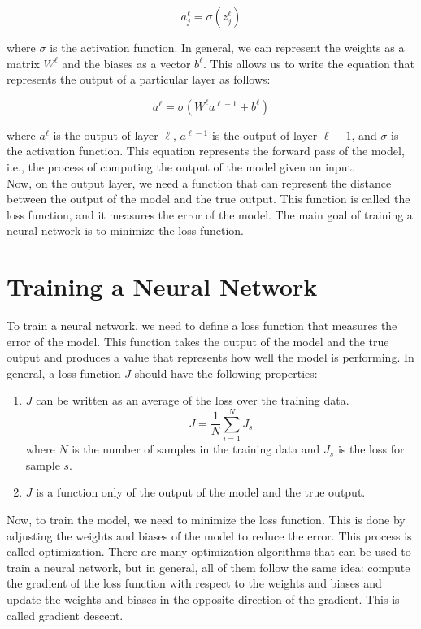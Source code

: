 \begin{equation}
    a_j^\ell = \sigma(z_j^\ell)
\end{equation}

where $\sigma$ is the activation function. In general, we can represent the weights
as a matrix $W^\ell$ and the biases as a vector $b^\ell$. This allows us to write
the equation that represents the output of a particular layer as follows:

\begin{equation}
    a^\ell = \sigma(W^\ell a^{\ell-1} + b^\ell)
\end{equation}
    
where $a^\ell$ is the output of layer $\ell$, $a^{\ell-1}$ is the output of layer
$\ell-1$, and $\sigma$ is the activation function. This equation represents the
forward pass of the model, i.e., the process of computing the output of the model
given an input.\\

Now, on the output layer, we need a function that can represent the distance between
the output of the model and the true output. This function is called the loss function,
and it measures the error of the model. The main goal of training a neural network is
to minimize the loss function.

\section{Training a Neural Network}

To train a neural network, we need to define a loss function that measures the error
of the model. This function takes the
output of the model and the true output and produces a value that represents how
well the model is performing. In general, a loss function $J$ should have the 
following properties:

\begin{enumerate}
    \item $J$ can be written as an average of the loss over the training data.
    $$J = \frac{1}{N} \sum_{i=1}^{N} J_s$$
    where $N$ is the number of samples in the training data and $J_s$ is the loss
    for sample $s$.

    \item $J$ is a function only of the output of the model and the true output.
\end{enumerate}

Now, to train the model, we need to minimize the loss function. This is done by
adjusting the weights and biases of the model to reduce the error. This process
is called optimization. There are many optimization algorithms that can be used
to train a neural network, but in general, all of them follow the same idea:
compute the gradient of the loss function with respect to the weights and biases
and update the weights and biases in the opposite direction of the gradient.
This is called gradient descent.\\

